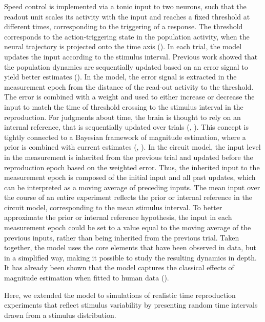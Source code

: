 \documentclass[10pt]{article}
\begin{document}
Speed control is implemented via a tonic input to two neurons, such that the readout unit scales its activity with the input and reaches a fixed threshold at different times, corresponding to the triggering of a response.  
The threshold corresponds to the action-triggering state in the population activity, when the neural trajectory is projected onto the time axis (\cite{Remington2018}).
In each trial, the model updates the input according to the stimulus interval.
Previous work showed that the population dynamics are sequentially updated based on an error signal to yield better estimates (\cite{Egger2019}).
In the model, the error signal is extracted in the measurement epoch from the distance of the read-out activity to the threshold. The error is combined with a weight and used to either increase or decrease the input to match the time of threshold crossing to the stimulus interval in the reproduction.
For judgments about time, the brain is thought to rely on an internal reference, that is sequentially updated over trials (\cite{Dyjas2012}, \cite{Bausenhart2014}). This concept is tightly connected to a Bayesian framework of magnitude estimation, where a prior is combined with current estimates (\cite{Shi2013}, \cite{Petzschner2015}).
In the circuit model, the input level in the measurement is inherited from the previous trial and updated before the reproduction epoch based on the weighted error.
Thus, the inherited input to the measurement epoch is composed of the initial input and all past updates, which can be interpreted as a moving average of preceding inputs. 
The mean input over the course of an entire experiment reflects the prior or internal reference in the circuit model, corresponding to the mean stimulus interval. 
To better approximate the prior or internal reference hypothesis, the input in each measurement epoch could be set to a value equal to the moving average of the previous inputs, rather than being inherited from the previous trial.  
Taken together, the model uses the core elements that have been observed in data, but in a simplified way, making it possible to study the resulting dynamics in depth. 
It has already been shown that the model captures the classical effects of magnitude estimation when fitted to human data (\cite{Egger2020}).

Here, we extended the model to simulations of realistic time reproduction experiments that reflect stimulus variability by presenting random time intervals drawn from a stimulus distribution.
\end{document}

